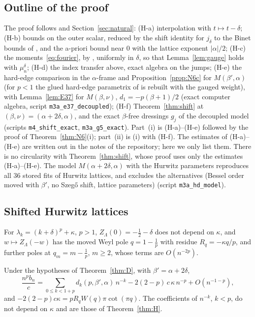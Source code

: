 \subsection{Outline of the proof}\label{sec:H-proof}
The proof follows \cite[Sections~5--10]{PaperII} and Section~\ref{sec:natural}: (H-a) interpolation with $t\mapsto t-\delta$; (H-b) bounds on the
outer scalar, reduced by the shift identity for $j_\delta$ to the Binet bounds of \cite{PaperII}, and the a-priori bound near $0$ with the
lattice exponent $|\alpha|/2$; (H-c) the moments~\eqref{eq:fourier}, by \cite[(5.9.1), (5.2.1), (25.2.1)]{DLMF}, uniformly in $\delta$, so that
Lemma~\ref{lem:gauge} holds with $\mu^\delta_n$; (H-d) the index transfer above, exact algebra on the jumps; (H-e) the hard-edge comparison in
the $\alpha$-frame and Proposition~\ref{prop:N6c} for $M(\beta',\alpha)$ (for $p<1$ the glued hard-edge parametrix of \cite[Section~10]{PaperII} is
rebuilt with the gauged weight), with Lemma~\ref{lem:E37} for $M(\beta,\nu)$, $d_1=-p(\beta+1)/2$ (exact computer algebra, script
\texttt{m3a\_e37\_decoupled}); (H-f) Theorem~\ref{thm:shift} at $(\beta,\nu)=(\alpha+2\delta,\alpha)$, and the exact $\beta$-free dressings $g_j$ of the
decoupled model (scripts \texttt{m4\_shift\_exact}, \texttt{m3a\_g5\_exact}). Part~(i) is (H-a)--(H-e) followed by the proof of
Theorem~\ref{thm:N6}(i); part~(ii) is (i) with (H-f). The estimates of (H-a)--(H-e) are written out in the notes of the repository; here we
only list them. There is no circularity with Theorem~\ref{thm:shift}, whose proof uses only the estimates (H-a)--(H-e). The model
$M(\alpha+2\delta,\alpha)$ with the Hurwitz parameters reproduces all $36$ stored fits of Hurwitz lattices, and excludes the alternatives (Bessel
order moved with $\beta'$, no Szeg\H{o} shift, lattice parameters) (script \texttt{m3a\_hd\_model}).

\subsection{Shifted Hurwitz lattices}\label{sec:kappa}
For $\lambda_k=(k+\delta)^p+\kappa$, $p>1$, $Z_\Lambda(0)=-\frac12-\delta$ does not depend on $\kappa$, and $w\mapsto Z_\Lambda(-w)$ has the moved Weyl
pole $q=1-\frac1p$ with residue $R_q=-\kappa q/p$, and further poles at $q_m=m-\frac1p$, $m\ge2$, whose terms are $O(n^{-2p})$.

\begin{theorem}\label{thm:kappa}
Under the hypotheses of Theorem~\ref{thm:D}, with $\beta'=\alpha+2\delta$,
\[
  \frac{n^pb_n}c=\sum_{0\le k<1+p}d_k(p,\beta',\alpha)\,n^{-k}-2(2-p)\,c\,\kappa\,n^{-p}+O(n^{-1-p}),
\]
and $-2(2-p)c\kappa=pR_qW(q)\pi\cot(\pi q)$. The coefficients of $n^{-k}$, $k<p$, do not depend on $\kappa$ and are those of Theorem~\ref{thm:H}.
\end{theorem}

